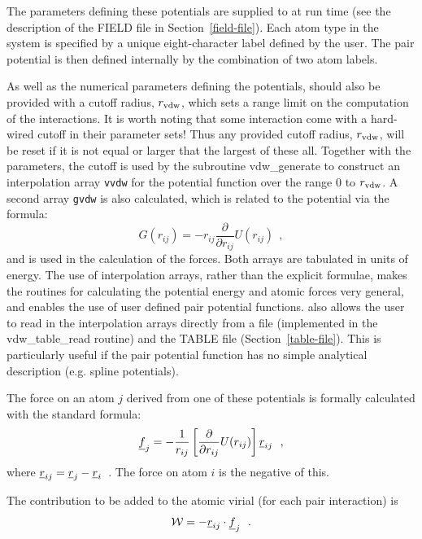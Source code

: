 The parameters defining these potentials are supplied to \D at run
time (see the description of the FIELD file in Section~\ref{field-file}).
Each atom type in the system is specified by a unique eight-character
label defined by the user.  The pair potential is then defined internally
by the combination of two atom labels.

As well as the numerical parameters defining the potentials, \D
should also be provided with a cutoff radius, $r_{\rm vdw}$, which
sets a range limit on the computation of the interactions.  It is
worth noting that some interaction come with a hard-wired cutoff in
their parameter sets!  Thus any provided cutoff radius, $r_{\rm vdw}$,
will be reset if it is not equal or larger that the largest of these all.
Together with the parameters, the cutoff is used by the subroutine
{\sc vdw\_generate} to construct an interpolation array {\tt vvdw} for
the potential function over the range 0 to $r_{\rm vdw}$.  A second
array {\tt gvdw} is also calculated, which is related to the
potential via the formula:
\begin{equation}
G(r_{ij}) = -r_{ij}\frac{\partial}{\partial r_{ij}}U(r_{ij})~~,
\end{equation}
and is used in the calculation of the forces.  Both arrays are
tabulated in units of energy.  The use of interpolation arrays,
rather than the explicit formulae, makes the routines for
calculating the potential energy and atomic forces very general, and
enables the use of user defined pair potential functions.  \D also
allows the user to read in the interpolation arrays directly from a
file (implemented in the {\sc vdw\_table\_read} routine) and the
TABLE file (Section~\ref{table-file}). This is particularly useful
if the pair potential function has no simple analytical description
(e.g. spline potentials).

The force on an atom $j$ derived from one of these potentials is
formally calculated with the standard formula:
\begin{equation}
\mbox{$\underline{f}$}_{j} = -\frac{1}{r_{ij}}\left[\frac{\partial}{\partial
r_{ij}}U(r_{ij})\right]\mbox{$\underline{r}$}_{ij}~~,
\end{equation}
where $\mbox{$\underline{r}$}_{ij} = \mbox{$\underline{r}$}_{j}-\mbox{$\underline{r}$}_{i}$~.  The force on
atom $i$ is the negative of this.

The contribution to be added to the atomic virial (for each pair
interaction) is
\begin{equation}
{\cal W} = -\mbox{$\underline{r}$}_{ij} \cdot \mbox{$\underline{f}$}_{j}~~.
\end{equation}

